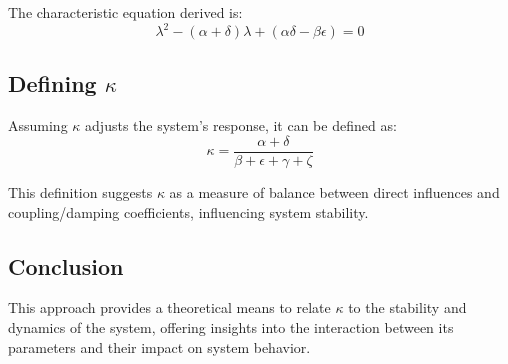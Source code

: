 \documentclass{article}
\begin{document}
The characteristic equation derived is:
\[
\lambda^2 - (\alpha + \delta)\lambda + (\alpha\delta - \beta\epsilon) = 0
\]

\subsection{Defining \( \kappa \)}
Assuming \( \kappa \) adjusts the system's response, it can be defined as:
\[
\kappa = \frac{\alpha + \delta}{\beta + \epsilon + \gamma + \zeta}
\]

This definition suggests \( \kappa \) as a measure of balance between direct influences and coupling/damping coefficients, influencing system stability.

\subsection{Conclusion}
This approach provides a theoretical means to relate \( \kappa \) to the stability and dynamics of the system, offering insights into the interaction between its parameters and their impact on system behavior.
\end{document}
